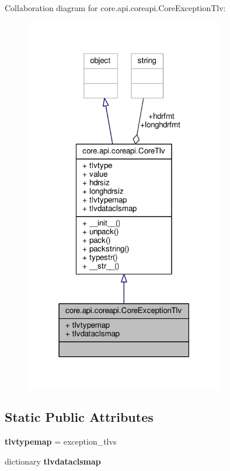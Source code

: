 Collaboration diagram for core.\+api.\+coreapi.\+Core\+Exception\+Tlv\+:
\nopagebreak
\begin{figure}[H]
\begin{center}
\leavevmode
\includegraphics[width=247pt]{classcore_1_1api_1_1coreapi_1_1_core_exception_tlv__coll__graph}
\end{center}
\end{figure}
\subsection*{Static Public Attributes}
\begin{DoxyCompactItemize}
\item 
\hypertarget{classcore_1_1api_1_1coreapi_1_1_core_exception_tlv_ae4768de303d60bd99db247d3050db67f}{{\bfseries tlvtypemap} = exception\+\_\+tlvs}\label{classcore_1_1api_1_1coreapi_1_1_core_exception_tlv_ae4768de303d60bd99db247d3050db67f}

\item 
dictionary {\bfseries tlvdataclsmap}
\end{DoxyCompactItemize}
